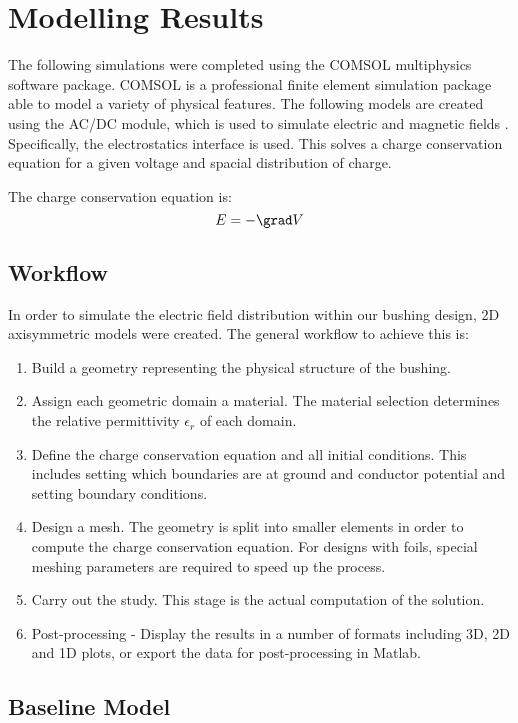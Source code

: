 
\section{Modelling Results}
The following simulations were completed using the COMSOL multiphysics software package.
COMSOL is a professional finite element simulation package able to model a variety of physical features.
The following models are created using the AC/DC module, which is used to simulate electric and magnetic fields \cite{}.
Specifically, the electrostatics interface is used. 
This solves a charge conservation equation for a given voltage and spacial distribution of charge.

The charge conservation equation is:
\begin{equation}
E = -\grad V
\end{equation}

\subsection{Workflow}
In order to simulate the electric field distribution within our bushing design, 2D axisymmetric models were created. The general workflow to achieve this is:
\begin{enumerate}
\item Build a geometry representing the physical structure of the bushing.
\item Assign each geometric domain a material. The material selection determines the relative permittivity $\epsilon_r$ of each domain.
\item Define the charge conservation equation and all initial conditions. This includes setting which boundaries are at ground and conductor potential and setting boundary conditions.
\item Design a mesh. The geometry is split into smaller elements in order to compute the charge conservation equation. For designs with foils, special meshing parameters are required to speed up the process.
\item Carry out the study. This stage is the actual computation of the solution.
\item Post-processing - Display the results in a number of formats including 3D, 2D and 1D plots, or export the data for post-processing in Matlab.
\end{enumerate}


\subsection{Baseline Model}


